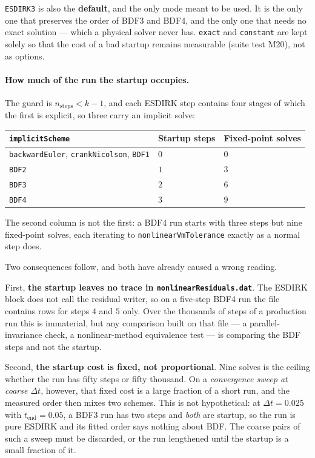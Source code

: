 \documentclass[11pt,a4paper]{article}
\newcommand{\code}[1]{\texttt{\small #1}}
\begin{document}
\code{ESDIRK3} is also the \textbf{default}, and the only mode meant to be used.
It is the only one that preserves the order of BDF3 and BDF4, and the only one
that needs no exact solution --- which a physical solver never has. \code{exact}
and \code{constant} are kept solely so that the cost of a bad startup remains
measurable (suite test M20), not as options.

\paragraph{How much of the run the startup occupies.} The guard is
$n_{\text{steps}}<k-1$, and each ESDIRK step contains four stages of which the
first is explicit, so three carry an implicit solve:
\begin{center}
\begin{tabular}{@{}lll@{}}
\toprule
\code{implicitScheme} & Startup steps & Fixed-point solves \\
\midrule
\code{backwardEuler}, \code{crankNicolson}, \code{BDF1} & $0$ & $0$ \\
\code{BDF2} & $1$ & $3$ \\
\code{BDF3} & $2$ & $6$ \\
\code{BDF4} & $3$ & $9$ \\
\bottomrule
\end{tabular}
\end{center}
The second column is not the first: a BDF4 run starts with three steps but nine
fixed-point solves, each iterating to \code{nonlinearVmTolerance} exactly as a
normal step does.

Two consequences follow, and both have already caused a wrong reading.

First, \textbf{the startup leaves no trace in
\code{nonlinearResiduals.dat}}. The ESDIRK block does not call the residual
writer, so on a five-step BDF4 run the file contains rows for steps $4$ and $5$
only. Over the thousands of steps of a production run this is immaterial, but
any comparison built on that file --- a parallel-invariance check, a
nonlinear-method equivalence test --- is comparing the BDF steps and not the
startup.

Second, \textbf{the startup cost is fixed, not proportional}. Nine solves is the
ceiling whether the run has fifty steps or fifty thousand. On a
\emph{convergence sweep at coarse $\Delta t$}, however, that fixed cost is a
large fraction of a short run, and the measured order then mixes two schemes.
This is not hypothetical: at $\Delta t=0.025$ with $t_{\text{end}}=0.05$, a BDF3
run has two steps and \emph{both} are startup, so the run is pure ESDIRK and its
fitted order says nothing about BDF. The coarse pairs of such a sweep must be
discarded, or the run lengthened until the startup is a small fraction of it.
\end{document}
